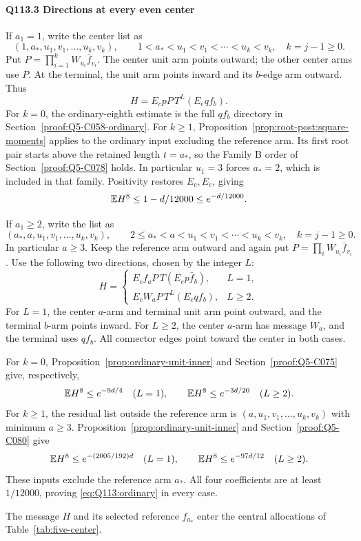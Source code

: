\paragraph{Q113.3 Directions at every even center}\label{part:Q113.3}
If $a_1=\allowbreak 1$, write the center list as
\[
 (1,a_*,u_1,v_1,\ldots,u_k,v_k),\qquad
 1<a_*<u_1<v_1<\cdots<u_k<v_k,\quad k=j-1\ge0.
\]
Put $P=\allowbreak \prod_{i=\allowbreak 1}^kW_{u_i}\bar f_{v_i}$.
The center unit arm points outward; the other center arms use $P$.
At the terminal, the unit arm points inward and its $b$-edge arm
outward. Thus
\begin{equation}\tag{Q113.3.1}\label{eq:Q113:minimum-one}
 H=E_cpP\,T^L(E_eqf_b).
\end{equation}
For $k=\allowbreak 0$, the ordinary-eighth estimate is the full
$qf_b$ directory in Section~\ref{proof:Q5-C058-ordinary}.
For \(k\ge1\), Proposition~\ref{prop:root-post:square-moments} applies to the ordinary input excluding the reference arm. Its first root pair starts above the retained length \(t=a_*\), so the Family B order of Section~\ref{proof:Q5-C078} holds.
In particular $u_1=\allowbreak 3$ forces $a_*=\allowbreak 2$, which is included in that
family. Positivity restores $E_c,\allowbreak E_e$, giving
\[
 \mathbb E H^8\le1-d/12000\le e^{-d/12000}.
\]

If $a_1\ge\allowbreak 2$, write the list as
\[
 (a_*,a,u_1,v_1,\ldots,u_k,v_k),\qquad
 2\le a_*<a<u_1<v_1<\cdots<u_k<v_k,\quad k=j-1\ge0.
\]
In particular $a\ge\allowbreak 3$. Keep the reference arm outward and again
put $P=\allowbreak \prod_iW_{u_i}\bar f_{v_i}$. Use the following two directions,
chosen by the integer $L$:
\begin{equation}\tag{Q113.dir}\label{eq:Q113:minimum-two}
 H=
 \begin{cases}
 E_cf_aP\,T(E_ep\bar f_b),&L=1,\\
 E_cW_aP\,T^L(E_eqf_b),&L\ge2.
 \end{cases}
\end{equation}
For $L=\allowbreak 1$, the center $a$-arm and terminal unit arm point outward,
and the terminal $b$-arm points inward. For $L\ge\allowbreak 2$, the center
$a$-arm has message $W_a$, and the terminal uses $qf_b$.
All connector edges point toward the center in both cases.

For \(k=0\), Proposition~\ref{prop:ordinary-unit-inner} and Section~\ref{proof:Q5-C075}
give, respectively,
\[
 \mathbb E H^8\le e^{-9d/4}\quad(L=1),\qquad
 \mathbb E H^8\le e^{-3d/20}\quad(L\ge2).
\]
For $k\ge\allowbreak 1$, the residual list outside the reference arm is
$(a,\allowbreak u_1,\allowbreak v_1,\allowbreak \ldots,\allowbreak u_k,\allowbreak v_k)$ with minimum $a\ge\allowbreak 3$.
Proposition~\ref{prop:ordinary-unit-inner} and
Section~\ref{proof:Q5-C080} give
\[
 \mathbb E H^8\le e^{-(2005/192)d}\quad(L=1),\qquad
 \mathbb E H^8\le e^{-97d/12}\quad(L\ge2).
\]
These inputs exclude the reference arm $a_*$.
All four coefficients are at least $1/12000$, proving
\eqref{eq:Q113:ordinary} in every case.

The message \(H\) and its selected reference \(f_{a_*}\) enter
the central allocations of Table~\ref{tab:five-center}.
